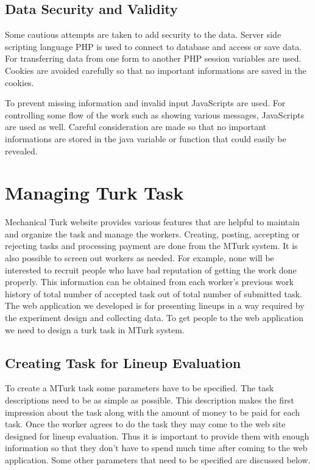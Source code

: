 \documentclass[11pt]{article}
\begin{document}


\subsection{Data Security and Validity} 

Some cautious attempts are taken to add security to the data. Server side scripting language PHP is used to connect to database and access or save data. For transferring data from one form to another PHP session variables are used. Cookies are avoided carefully so that no important informations are saved in the cookies. 

To prevent missing information and invalid input JavaScripts are used. For controlling some flow of the work such as showing various messages, JavaScripts are used as well. Careful consideration are made so that no important informations are stored in the java variable or function that could easily be revealed.


\section{Managing Turk Task}\label{sec:turk_task} \cite{turk} Mechanical Turk website provides various features that are helpful to maintain and organize the task and manage the workers. Creating, posting, accepting or rejecting tasks and processing payment are done from the MTurk system. It is also possible to screen out workers as needed. For example, none will be interested to recruit people who have bad reputation of getting the work done properly. This information can be obtained from each worker's previous work history of total number of accepted task out of total number of submitted task. The web application we developed is for presenting lineups in a way required by the experiment design and collecting data. To get people to the web application we need to design a turk task in MTurk system.



\subsection{Creating Task for Lineup Evaluation} To create a MTurk task some parameters have to be specified. The task descriptions need to be as simple as possible. This description makes the first impression about the task along with the amount of money to be paid for each task. Once the worker agrees to do the task they may come to the web site designed for lineup evaluation. Thus it is important to provide them with enough information so that they don't have to spend much time after coming to the web application. Some other parameters that need to be specified are discussed below.
\end{document}
